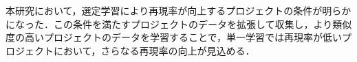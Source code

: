 \documentclass[paper]{ieicej}
\begin{document}
本研究において，選定学習により再現率が向上するプロジェクトの条件が明らかになった．この条件を満たすプロジェクトのデータを拡張して収集し，より類似度の高いプロジェクトのデータを学習することで，単一学習では再現率が低いプロジェクトにおいて，さらなる再現率の向上が見込める．


%
%




\begin{biography}
\end{biography}
\end{document}
